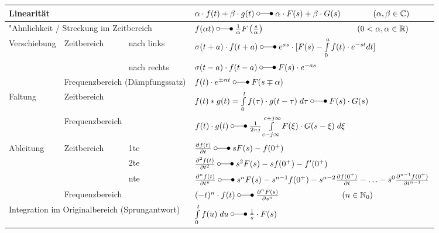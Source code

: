 	  \renewcommand{\arraystretch}{2}
		\begin{tabular}{|p{2.5cm}|p{3cm}|p{2.5cm}p{10cm}|}
			\hline
				\multicolumn{3}{|l}{Linearität}   &  $\alpha\cdot f(t) + \beta\cdot g(t) \; \laplace \; \alpha\cdot F(s) + \beta\cdot G(s) \qquad\qquad (\alpha, \beta \in\mathbb{C})$ \\ 
			\hline
				\multicolumn{3}{|l}{"Ahnlichkeit / Streckung im Zeitbereich}   &  $f(\alpha t) \; \laplace \; \frac{1}{\alpha}F \left (\frac{s}{\alpha} \right ) \hspace{4cm} (0 <\alpha, \alpha \in\mathbb{R})$ \\
			\hline
			\hline
				\multirow{3}{*}{Verschiebung} & \multirow{2}{*}{Zeitbereich} & nach links &  $\sigma(t+a) \cdot f(t + a) \; \laplace \; e^{as} \cdot [F(s) - \int\limits_0^{a} f(t) \cdot e^{-st} dt]$	 \\ \cline{3-4} 
				&  & nach rechts  & $\sigma(t-a) \cdot f(t - a) \; \laplace \; F(s) \cdot e^{-as}$ \\ \cline{2-4}
				& \multicolumn{2}{l}{Frequenzbereich (Dämpfungssatz)} & $f(t) \cdot e^{\pm\alpha t} \; \laplace \; F(s\mp\alpha)$\\ 
			\hline
			\hline
				\multirow{2}{*}{Faltung} & \multicolumn{2}{l}{Zeitbereich} & $f(t) \ast g(t) = \int\limits_{0}^{t} f(\tau) \cdot g(t-\tau) \; d\tau \; \laplace \; F(s)
				\cdot G(s)$ \\ \cline{2-4} 
				& \multicolumn{2}{l}{Frequenzbereich} &  $f(t) \cdot g(t) \; \laplace \; \frac{1}{2\pi j}\int\limits_{c-j\infty}^{c+j\infty}
				F(\xi) \cdot G(s-\xi) \; d\xi$\\ 
			\hline
			\hline
				\multirow{4}{*}{Ableitung} & \multirow{3}{*}{Zeitbereich} & 1te & 	$\frac{\partial f(t)}{\partial t} \; \laplace \; sF(s)-f(0^+)$ \\ \cline{3-4}
				&  & 2te  &  $\frac{\partial^2 f(t)}{\partial t^2} \; \laplace \; s^2F(s)		-sf(0^+) -f'(0^+)$\\ \cline{3-4}
				&  & nte  &  $\frac{\partial^n f(t)}{\partial t^n} \; \laplace \; s^nF(s)
				-s^{n-1}f(0^+)-s^{n-2}\frac{\partial f(0^+)}{\partial t}-\ldots
				-s^0\frac{\partial^{n-1} f(0^+)}{\partial t^{n-1}}$\\ \cline{2-4} 
				& \multicolumn{2}{l}{Frequenzbereich} & $(-t)^n \cdot f(t) \; \laplace \;  \frac{\partial^n F(s)}{\partial s^n} \qquad \hspace{2cm} (n \in \mathbb{N}_0)$\\
			\hline
			\hline
				\multicolumn{3}{|l}{Integration im Originalbereich (Sprungantwort)}   &  $\int\limits_0^t f(u) \; du \; \laplace \; \frac{1}{s}\cdot F(s)$ \\

\end{tabular}
